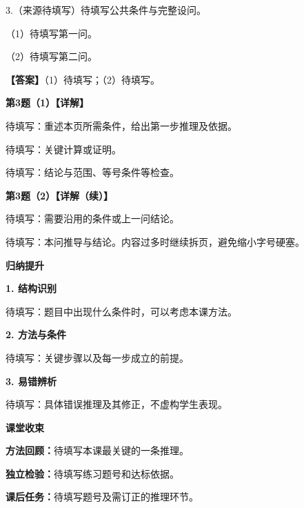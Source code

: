 \documentclass[UTF8,10pt,aspectratio=169]{ctexbeamer}
\newcommand{\PageHeading}[1]{\begin{center}{\Large\bfseries #1}\end{center}\vspace{0.2cm}}
\newcommand{\Answer}[1]{\par\vspace{0.2cm}\textbf{【答案】}#1}
\begin{document}
\begin{frame}
  3.（来源待填写）待填写公共条件与完整设问。
  \par\vspace{0.2cm}
  （1）待填写第一问。
  \par
  （2）待填写第二问。
  \pause
  \Answer{（1）待填写；（2）待填写。}
\end{frame}

\begin{frame}
  \textbf{第3题（1）\quad【详解】}
  \par\vspace{0.3cm}
  待填写：重述本页所需条件，给出第一步推理及依据。
  \pause
  \par\vspace{0.3cm}
  待填写：关键计算或证明。
  \pause
  \par\vspace{0.3cm}
  待填写：结论与范围、等号条件等检查。
\end{frame}

\begin{frame}
  \textbf{第3题（2）\quad【详解（续）】}
  \par\vspace{0.3cm}
  待填写：需要沿用的条件或上一问结论。
  \pause
  \par\vspace{0.3cm}
  待填写：本问推导与结论。内容过多时继续拆页，避免缩小字号硬塞。
\end{frame}

\begin{frame}
  \PageHeading{归纳提升}
  \textbf{1. 结构识别}\par
  待填写：题目中出现什么条件时，可以考虑本课方法。
  \pause
  \par\vspace{0.3cm}
  \textbf{2. 方法与条件}\par
  待填写：关键步骤以及每一步成立的前提。
  \pause
  \par\vspace{0.3cm}
  \textbf{3. 易错辨析}\par
  待填写：具体错误推理及其修正，不虚构学生表现。
\end{frame}

\begin{frame}
  \PageHeading{课堂收束}
  \textbf{方法回顾：}待填写本课最关键的一条推理。
  \par\vspace{0.3cm}
  \textbf{独立检验：}待填写练习题号和达标依据。
  \par\vspace{0.3cm}
  \textbf{课后任务：}待填写题号及需订正的推理环节。
\end{frame}

\end{document}
